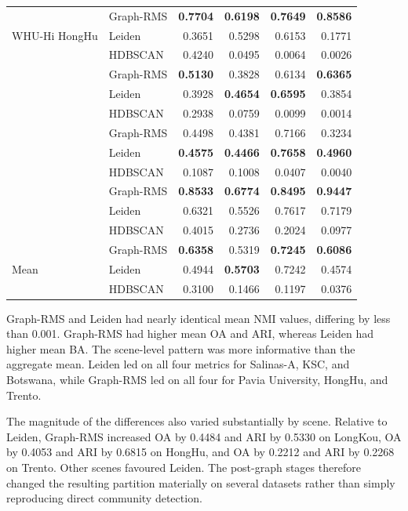 \documentclass[10pt,a4paper,fleqn]{article}
\begin{document}
\begin{table}[!t]
\begin{tabular}{@{}llrrrr@{}}
\multirow{3}{*}{WHU-Hi HongHu}
& Graph-RMS & \textbf{0.7704} & \textbf{0.6198} & \textbf{0.7649} & \textbf{0.8586} \\
& Leiden    & 0.3651 & 0.5298 & 0.6153 & 0.1771 \\
& HDBSCAN   & 0.4240 & 0.0495 & 0.0064 & 0.0026 \\
\addlinespace[2pt]

\multirow{3}{*}{WHU-Hi HanChuan}
& Graph-RMS & \textbf{0.5130} & 0.3828 & 0.6134 & \textbf{0.6365} \\
& Leiden    & 0.3928 & \textbf{0.4654} & \textbf{0.6595} & 0.3854 \\
& HDBSCAN   & 0.2938 & 0.0759 & 0.0099 & 0.0014 \\
\addlinespace[2pt]

\multirow{3}{*}{Botswana}
& Graph-RMS & 0.4498 & 0.4381 & 0.7166 & 0.3234 \\
& Leiden    & \textbf{0.4575} & \textbf{0.4466} & \textbf{0.7658} & \textbf{0.4960} \\
& HDBSCAN   & 0.1087 & 0.1008 & 0.0407 & 0.0040 \\
\addlinespace[2pt]

\multirow{3}{*}{Trento}
& Graph-RMS & \textbf{0.8533} & \textbf{0.6774} & \textbf{0.8495} & \textbf{0.9447} \\
& Leiden    & 0.6321 & 0.5526 & 0.7617 & 0.7179 \\
& HDBSCAN   & 0.4015 & 0.2736 & 0.2024 & 0.0977 \\
\midrule

\multirow{3}{*}{Mean}
& Graph-RMS & \textbf{0.6358} & 0.5319 & \textbf{0.7245} & \textbf{0.6086} \\
& Leiden    & 0.4944 & \textbf{0.5703} & 0.7242 & 0.4574 \\
& HDBSCAN   & 0.3100 & 0.1466 & 0.1197 & 0.0376 \\
\bottomrule
\end{tabular}
\end{table}

Graph-RMS and Leiden had nearly identical mean NMI values, differing by less
than 0.001. Graph-RMS had higher mean OA and ARI, whereas Leiden had higher
mean BA. The scene-level pattern was more informative than the aggregate mean.
Leiden led on all four metrics for Salinas-A, KSC, and Botswana, while
Graph-RMS led on all four for Pavia University, HongHu, and Trento.

The magnitude of the differences also varied substantially by scene. Relative
to Leiden, Graph-RMS increased OA by 0.4484 and ARI by 0.5330 on LongKou,
OA by 0.4053 and ARI by 0.6815 on HongHu, and OA by 0.2212 and ARI by
0.2268 on Trento. Other scenes favoured Leiden. The post-graph stages
therefore changed the resulting partition materially on several datasets
rather than simply reproducing direct community detection.
\end{document}
